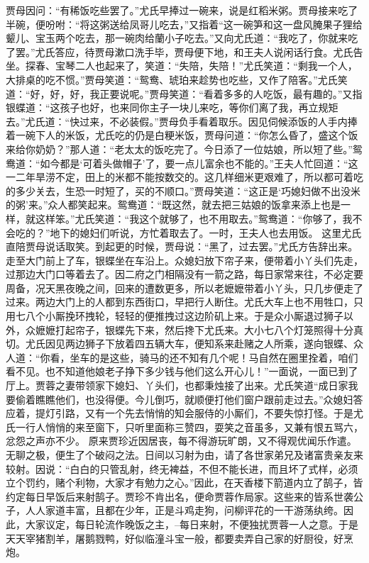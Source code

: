 \documentclass[12pt,oneside]{book}
\begin{document}
贾母因问：“有稀饭吃些罢了。”尤氏早捧过一碗来，说是红稻米粥。贾母接来吃了半碗，便吩咐：“将这粥送给凤哥儿吃去，”又指着“这一碗笋和这一盘风腌果子狸给颦儿、宝玉两个吃去，那一碗肉给蘭小子吃去。”又向尤氏道：“我吃了，你就来吃了罢。”尤氏答应，待贾母漱口洗手毕，贾母便下地，和王夫人说闲话行食。尤氏告坐。探春、宝琴二人也起来了，笑道：“失陪，失陪！”尤氏笑道：“剩我一个人，大排桌的吃不惯。”贾母笑道：“鸳鸯、琥珀来趁势也吃些，又作了陪客。”尤氏笑道：“好，好，好，我正要说呢。”贾母笑道：“看着多多的人吃饭，最有趣的。”又指银蝶道：“这孩子也好，也来同你主子一块儿来吃，等你们离了我，再立规矩去。”尤氏道：“快过来，不必装假。”贾母负手看着取乐。因见伺候添饭的人手内捧着一碗下人的米饭，尤氏吃的仍是白粳米饭，贾母问道：“你怎么昏了，盛这个饭来给你奶奶？”那人道：“老太太的饭吃完了。今日添了一位姑娘，所以短了些。”鸳鸯道：“如今都是‘可着头做帽子’了，要一点儿富余也不能的。”王夫人忙回道：“这一二年旱涝不定，田上的米都不能按数交的。这几样细米更艰难了，所以都可着吃的多少关去，生恐一时短了，买的不顺口。”贾母笑道：“这正是‘巧媳妇做不出没米的粥’来。”众人都笑起来。鸳鸯道：“既这然，就去把三姑娘的饭拿来添上也是一样，就这样笨。”尤氏笑道：“我这个就够了，也不用取去。”鸳鸯道：“你够了，我不会吃的？”地下的媳妇们听说，方忙着取去了。一时，王夫人也去用饭。
这里尤氏直陪贾母说话取笑。到起更的时候，贾母说：“黑了，过去罢。”尤氏方告辞出来。走至大门前上了车，银蝶坐在车沿上。众媳妇放下帘子来，便带着小丫头们先走，过那边大门口等着去了。因二府之门相隔没有一箭之路，每日家常来往，不必定要周备，况天黑夜晚之间，回来的遭数更多，所以老嬷嬷带着小丫头，只几步便走了过来。两边大门上的人都到东西街口，早把行人断住。尤氏大车上也不用牲口，只用七八个小厮挽环拽轮，轻轻的便推拽过这边阶矶上来。于是众小厮退过狮子以外，众嬷嬷打起帘子，银蝶先下来，然后搀下尤氏来。大小七八个灯笼照得十分真切。尤氏因见两边狮子下放着四五辆大车，便知系来赴赌之人所乘，遂向银蝶、众人道：“你看，坐车的是这些，骑马的还不知有几个呢！马自然在圈里拴着，咱们看不见。也不知道他娘老子挣下多少钱与他们这么开心儿！”一面说，一面已到了厅上。贾蓉之妻带领家下媳妇、丫头们，也都秉烛接了出来。尤氏笑道“成日家我要偷着瞧瞧他们，也没得便。今儿倒巧，就顺便打他们窗户跟前走过去。”众媳妇答应着，提灯引路，又有一个先去悄悄的知会服侍的小厮们，不要失惊打怪。于是尤氏一行人悄悄的来至窗下，只听里面称三赞四，耍笑之音虽多，又兼有恨五骂六，忿怨之声亦不少。
原来贾珍近因居丧，每不得游玩旷朗，又不得观优闻乐作遣。无聊之极，便生了个破闷之法。日间以习射为由，请了各世家弟兄及诸富贵亲友来较射。因说：“白白的只管乱射，终无裨益，不但不能长进，而且坏了式样，必须立个罚约，赌个利物，大家才有勉力之心。”因此，在天香楼下箭道内立了鹄子，皆约定每日早饭后来射鹄子。贾珍不肯出名，便命贾蓉作局家。这些来的皆系世袭公子，人人家道丰富，且都在少年，正是斗鸡走狗，问柳评花的一干游荡纨绔。因此，大家议定，每日轮流作晚饭之主，--每日来射，不便独扰贾蓉一人之意。于是天天宰猪割羊，屠鹅戮鸭，好似临潼斗宝一般，都要卖弄自己家的好厨役，好烹炮。
\end{document}
